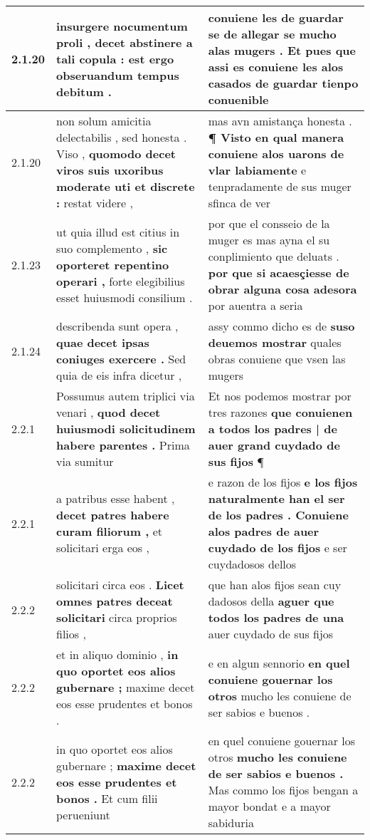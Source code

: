 \begin{tabular}{|p{1cm}|p{6.5cm}|p{6.5cm}|}
2.1.20 & insurgere nocumentum proli , \textbf{ decet abstinere a tali copula : } est ergo obseruandum tempus debitum . & conuiene les de guardar se \textbf{ de allegar se mucho alas mugers . Et pues que assi es conuiene les alos casados } de guardar tienpo conuenible \\\hline
2.1.20 & non solum amicitia delectabilis , sed honesta . Viso , \textbf{ quomodo decet viros suis uxoribus moderate uti et discrete : } restat videre , & mas avn amistança honesta . \textbf{ ¶ Visto en qual manera conuiene alos uarons de vlar labiamente } e tenpradamente de sus muger sfinca de ver \\\hline
2.1.23 & ut quia illud est citius in suo complemento , \textbf{ sic oporteret repentino operari , } forte elegibilius esset huiusmodi consilium . & por que el consseio de la muger es mas ayna el su conplimiento que deluats . \textbf{ por que si acaesçiesse de obrar alguna cosa adesora } por auentra a seria \\\hline
2.1.24 & describenda sunt opera , \textbf{ quae decet ipsas coniuges exercere . } Sed quia de eis infra dicetur , & assy commo dicho es de \textbf{ suso deuemos mostrar } quales obras conuiene que vsen las mugers \\\hline
2.2.1 & Possumus autem triplici via venari , \textbf{ quod decet huiusmodi solicitudinem habere parentes . } Prima via sumitur & Et nos podemos mostrar por tres razones \textbf{ que conuienen a todos los padres | de auer grand cuydado de sus fijos } ¶ \\\hline
2.2.1 & a patribus esse habent , \textbf{ decet patres habere curam filiorum , } et solicitari erga eos , & e razon de los fijos \textbf{ e los fijos naturalmente han el ser de los padres . Conuiene alos padres de auer cuydado de los fijos } e ser cuydadosos dellos \\\hline
2.2.2 & solicitari circa eos . \textbf{ Licet omnes patres deceat solicitari } circa proprios filios , & que han alos fijos sean cuy dadosos della \textbf{ aguer que todos los padres de una } auer cuydado de sus fijos \\\hline
2.2.2 & et in aliquo dominio , \textbf{ in quo oportet eos alios gubernare ; } maxime decet eos esse prudentes et bonos . & e en algun sennorio \textbf{ en quel conuiene gouernar los otros } mucho les conuiene de ser sabios e buenos . \\\hline
2.2.2 & in quo oportet eos alios gubernare ; \textbf{ maxime decet eos esse prudentes et bonos . } Et cum filii perueniunt & en quel conuiene gouernar los otros \textbf{ mucho les conuiene de ser sabios e buenos . } Mas commo los fijos bengan a mayor bondat e a mayor sabiduria \\\hline

\end{tabular}
